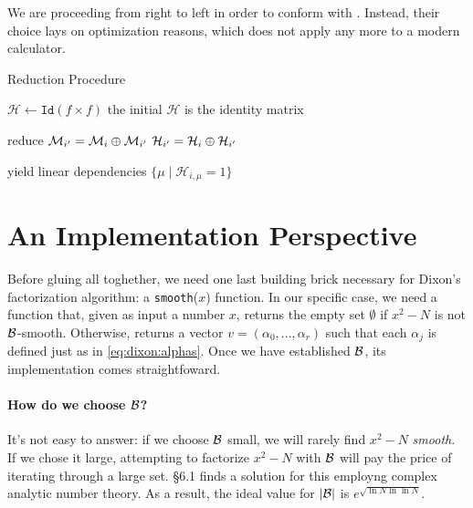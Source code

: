 \begin{remark}
  We are proceeding from right to left in order to conform with
  \cite{morrison-brillhart}.
  Instead, their choice lays on optimization reasons, which does
  not apply any more to a modern calculator.
\end{remark}

\begin{algorithm}
  \caption{Reduction Procedure  \label{alg:dixon:kernel}}
  \begin{algorithmic}[1]
    \State $\mathcal{H} \gets \texttt{Id}(f \times f)$
    \Comment the initial $\mathcal{H}$ is the identity matrix

    \Comment reduce
              \State $\mathcal{M}_{i'} = \mathcal{M}_i \oplus \mathcal{M}_{i'}$
              \State $\mathcal{H}_{i'} = \mathcal{H}_i \oplus \mathcal{H}_{i'}$
            \EndIf
          \EndFor
          \State {}
        \EndIf
      \EndFor
    \EndFor

    \Comment yield linear dependencies
         $\{\mu  \mid \mathcal{H}_{i,\mu} = 1\}$
      \EndIf
    \EndFor
    \EndFunction
  \end{algorithmic}
\end{algorithm}


\section{An Implementation Perspective}

Before gluing all toghether, we need one last building brick necessary for
Dixon's factorization algorithm: a \texttt{smooth}($x$) function. In our
specific case, we need a function that, given as input a number $x$, returns the
empty set $\emptyset$ if $x^2 -N$ is not $\mathcal{B}$-smooth. Otherwise,
returns a vector $v = (\alpha_0, \ldots, \alpha_r)$ such that each $\alpha_j$ is
defined just as in \ref{eq:dixon:alphas}. Once we have established $\mathcal{B}$, its
implementation comes straightfoward.

\paragraph{How do we choose $\mathcal{B}$?}
It's not easy to answer: if we choose $\mathcal{B}$ small, we will rarely find
$x^2 -N$ \emph{smooth}. If we chose it large, attempting to factorize $x^2 -N$
with $\mathcal{B}$ will pay the price of iterating through a large set.
\cite{Crandall} \S 6.1 finds a solution for this employng complex analytic
number theory. As a  result, the ideal value for $|\mathcal{B}|$ is
$e^{\sqrt{\ln N \ln \ln N}}$.


